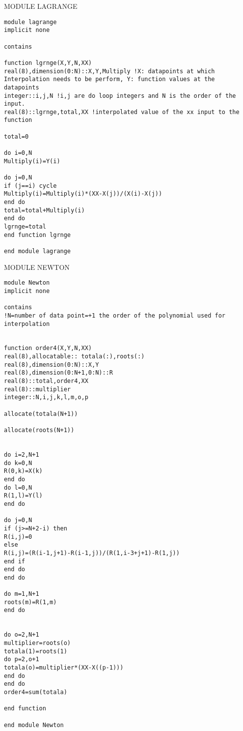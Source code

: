 \documentclass[10pt,a4paper]{article}
\begin{document}
MODULE LAGRANGE
   \begin{lstlisting}
module lagrange
implicit none
	
contains

function lgrnge(X,Y,N,XX)
real(8),dimension(0:N)::X,Y,Multiply !X: datapoints at which Interpolation needs to be perform, Y: function values at the datapoints
integer::i,j,N !i,j are do loop integers and N is the order of the input.
real(8)::lgrnge,total,XX !interpolated value of the xx input to the function
	
total=0
	
do i=0,N
Multiply(i)=Y(i)
	
do j=0,N
if (j==i) cycle 
Multiply(i)=Multiply(i)*(XX-X(j))/(X(i)-X(j))
end do
total=total+Multiply(i)
end do
lgrnge=total
end function lgrnge
	
end module lagrange
	\end{lstlisting}
		
		
	MODULE NEWTON
	\begin{lstlisting}
module Newton
implicit none
	
contains
!N=number of data point=+1 the order of the polynomial used for interpolation
	
	
function order4(X,Y,N,XX)
real(8),allocatable:: totala(:),roots(:)
real(8),dimension(0:N)::X,Y
real(8),dimension(0:N+1,0:N)::R
real(8)::total,order4,XX
real(8)::multiplier
integer::N,i,j,k,l,m,o,p

allocate(totala(N+1))
	
allocate(roots(N+1))
	
	
do i=2,N+1
do k=0,N
R(0,k)=X(k)
end do 
do l=0,N
R(1,l)=Y(l)
end do
	
do j=0,N
if (j>=N+2-i) then
R(i,j)=0
else
R(i,j)=(R(i-1,j+1)-R(i-1,j))/(R(1,i-3+j+1)-R(1,j))
end if
end do
end do
	
do m=1,N+1
roots(m)=R(1,m)
end do
	
	
do o=2,N+1
multiplier=roots(o)
totala(1)=roots(1)
do p=2,o+1
totala(o)=multiplier*(XX-X((p-1)))
end do
end do 
order4=sum(totala)
	
end function

end module Newton
\end{lstlisting}
\end{document}

